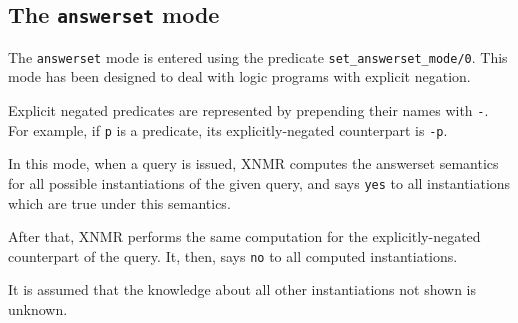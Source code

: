 \documentclass{article}
\begin{document}
\subsection{The \texttt{answerset} mode}

The \texttt{answerset} mode is entered using the predicate
\texttt{set\_answerset\_mode/0}. This mode has been designed to deal
with logic programs with explicit negation.

Explicit negated predicates are represented by prepending their names
with \verb#-#. For example, if \verb#p# is a predicate, its
explicitly-negated counterpart is \verb#-p#.

In this mode, when a query is issued, XNMR computes the answerset
semantics for all possible instantiations of the given query, and says
\verb#yes# to all instantiations which are true under this semantics. 

After that, XNMR performs the same computation for the
explicitly-negated counterpart of the query. It, then, says \verb#no# to
all computed instantiations. 

It is assumed that the knowledge about all other instantiations not
shown is unknown.
\end{document}
